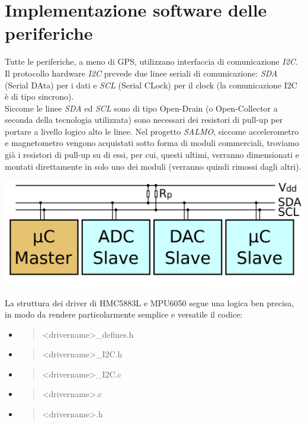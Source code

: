\hypertarget{implementazione-software-delle-periferiche}{%
\section{Implementazione software delle
periferiche}\label{implementazione-software-delle-periferiche}}

Tutte le periferiche, a meno di GPS, utilizzano interfaccia di
comunicazione \emph{I2C}.\\
Il protocollo hardware \emph{I2C} prevede due linee seriali di
comunicazione: \emph{SDA} (Serial DAta) per i dati e \emph{SCL} (Serial
CLock) per il clock (la comunicazione I2C è di tipo sincrono).\\
Siccome le linee \emph{SDA} ed \emph{SCL} sono di tipo Open-Drain (o
Open-Collector a seconda della tecnologia utilizzata) sono necessari dei
resistori di pull-up per portare a livello logico alto le linee. Nel
progetto \emph{SALMO}, siccome accelerometro e magnetometro vengono
acquistati sotto forma di moduli commerciali, troviamo già i resistori
di pull-up su di essi, per cui, questi ultimi, verranno dimensionati e
montati direttamente in solo uno dei moduli (verranno quindi rimossi
dagli altri).

\begin{center}
\includegraphics[scale=0.2]{figures/image61.png}
\captionsetup{type=figure}
\end{center}

\noindent La struttura dei driver di HMC5883L e MPU6050 segue una logica ben
precisa, in modo da rendere particolarmente semplice e versatile il
codice:

\begin{itemize}
\item
  \begin{quote}
  \textless drivername\textgreater\_defines.h
  \end{quote}
\item
  \begin{quote}
  \textless drivername\textgreater\_I2C.h
  \end{quote}
\item
  \begin{quote}
  \textless drivername\textgreater\_I2C.c
  \end{quote}
\item
  \begin{quote}
  \textless drivername\textgreater.c
  \end{quote}
\item
  \begin{quote}
  \textless drivername\textgreater.h
  \end{quote}
\end{itemize}


